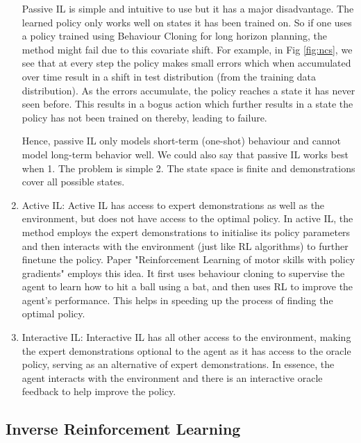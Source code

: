 \documentclass[11pt]{article}
\begin{document}
\begin{enumerate}
    Passive IL is simple and intuitive to use but it has a major disadvantage. The learned policy only works well on states it has been trained on. So if one uses a policy trained using Behaviour Cloning for long horizon planning, the method might fail due to this covariate shift. For example, in Fig \ref{fig:ncs}, we see that at every step the policy makes small errors which when accumulated over time result in a shift in test distribution (from the training data distribution). As the errors accumulate, the policy reaches a state it has never seen before. This results in a bogus action which further results in a state the policy has not been trained on thereby, leading to failure. 
    
    Hence, passive IL only models short-term (one-shot) behaviour and cannot model long-term behavior well. We could also say that passive IL works best when 1. The problem is simple 2. The state space is finite and demonstrations cover all possible states. 
    
    \item Active IL:
    Active IL has access to expert demonstrations as well as the environment, but does not have access to the optimal policy. In active IL, the method employs the expert demonstrations to initialise its policy parameters and then interacts with the environment (just like RL algorithms) to further finetune the policy. Paper "Reinforcement Learning of motor skills with policy gradients" \cite{peters2008reinforcement} employs this idea. It first uses behaviour cloning to supervise the agent to learn how to hit a ball using a bat, and then uses RL to improve the agent's performance. This helps in speeding up the process of finding the optimal policy.
    
    \item Interactive IL:
    Interactive IL has all other access to the environment, making the expert demonstrations optional to the agent as it has access to the oracle policy, serving as an alternative of expert demonstrations. In essence, the agent interacts with the environment and there is an interactive oracle feedback to help improve the policy. 
     
\end{enumerate}



\subsection{Inverse Reinforcement Learning}
\end{document}

